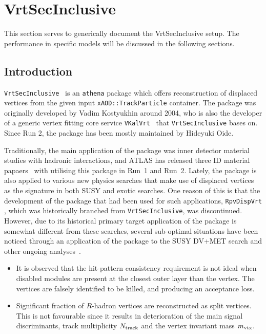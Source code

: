 
%
\section{VrtSecInclusive \label{sec:VSI} }
%

This section serves to generically document the VrtSecInclusive setup.
The performance in specific models will be discussed in the following sections.

%
\subsection{Introduction}
\label{sec:intro}

{\tt VrtSecInclusive}~\cite{} is an {\tt athena} package which offers reconstruction of displaced vertices from the given input {\tt xAOD::TrackParticle} container. The package was originally developed by Vadim Kostyukhin around 2004, who is also the developer of a generic vertex fitting core service {\tt VKalVrt}~\cite{} that {\tt VrtSecInclusive} bases on. Since Run 2, the package has been mostly maintained by Hideyuki Oide.

Traditionally, the main application of the package was inner detector material studies with hadronic interactions, and ATLAS has released three ID material papaers~\cite{} with utilising this package in Run~1 and Run~2. Lately, the package is also applied to various new physics searches that make use of displaced vertices as the signature in both SUSY and exotic searches. One reason of this is that the development of the package that had been used for such applications, {\tt RpvDispVrt} \cite{}, which was historically branched from {\tt VrtSecInclusive}, was discontinued. However, due to its historical primary target application of the package is somewhat different from these searches, several sub-optimal situations have been noticed through an application of the package to the SUSY DV+MET search and other ongoing analyses~\cite{}.

\begin{itemize}
  \item It is observed that the hit-pattern consistency requirement is not ideal when disabled modules are present at the closest outer layer than the vertex. The vertices are falsely identified to be killed, and producing an acceptance loss.
  \item Significant fraction of $R$-hadron vertices are reconstructed as split vertices. This is not favourable since it results in deterioration of the main signal discriminants, track multiplicity $N_{\rm track}$ and the vertex invariant mass $m_{\rm vtx}$.
\end{itemize}

